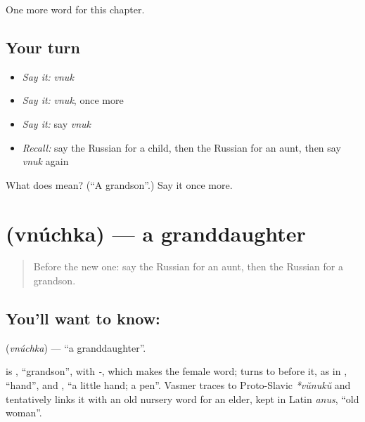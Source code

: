 \begin{grammarlens}[title={What you've built}]
One more word for this chapter.
\end{grammarlens}

\subsection*{Your turn}
\begin{itemize}
\raggedright
  \item \emph{Say it:} \emph{vnuk}
  \item \emph{Say it:} \emph{vnuk}, once more
  \item \emph{Say it:} say \emph{vnuk}
  \item \emph{Recall:} say the Russian for a child, then the Russian for an aunt, then say \emph{vnuk} again
\end{itemize}

\begin{tcolorbox}[breakable,colback=teal!4,colframe=teal!35!black,title={Before you move on}]
What does  mean? (\textquotedblleft{}A grandson\textquotedblright{}.) Say it once more.
\end{tcolorbox}
\section[\texorpdfstring{\ru{внучка} (vnúchka)}{внучка (vnúchka)}]{ (vnúchka) — a granddaughter}

\label{lesson:RU-C36-granddaughter}



\begin{quote}
Before the new one: say the Russian for an aunt, then the Russian for a grandson.
\end{quote}

\subsection*{You'll want to know: }
\textbf{} (\emph{vnúchka}) — \textquotedblleft{}a granddaughter\textquotedblright{}.

\begin{cousinweb}
\textbf{} is \emph{}, \textquotedblleft{}grandson\textquotedblright{}, with \emph{-}, which makes the female word; \emph{} turns to \emph{} before it, as in \emph{}, \textquotedblleft{}hand\textquotedblright{}, and \emph{}, \textquotedblleft{}a little hand; a pen\textquotedblright{}. Vasmer traces \emph{} to Proto-Slavic \emph{*vŭnukŭ} and tentatively links it with an old nursery word for an elder, kept in Latin \emph{anus}, \textquotedblleft{}old woman\textquotedblright{}.
\end{cousinweb}

